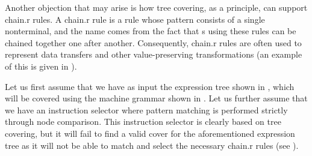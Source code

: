 Another objection that may arise is how \gls{tree covering}, as a
\gls{principle}, can support \gls{chain.r} \glspl{rule}.
%
A \gls{chain.r} \gls{rule} is a \gls{rule} whose \gls{pattern} consists of a
single \gls{nonterminal}, and the name comes from the fact that s using these \glspl{rule} can be chained together one after
another.
%
Consequently, \gls{chain.r} \glspl{rule} are often used to represent data
transfers and other value-preserving transformations (an example of this is
given in ).

Let us first assume that we have as input the \gls{expression tree} shown in
, which will be covered using the
\gls{machine grammar} shown in .
%
Let us further assume that we have an \gls{instruction selector} where
\gls{pattern matching} is performed strictly through \gls{node} comparison.
%
This \gls{instruction selector} is clearly based on \gls{tree covering}, but it
will fail to find a valid cover for the aforementioned \gls{expression tree} as
it will not be able to match and select the necessary \gls{chain.r} \glspl{rule}
(see ).

